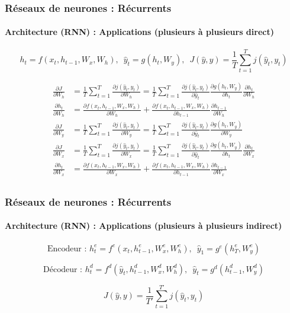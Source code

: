 \documentclass[xcolor=table]{beamer}
\begin{document}
\begin{frame}
	\frametitle{Réseaux de neurones : Récurrents}
	\framesubtitle{Architecture (RNN) : Applications (plusieurs à plusieurs direct)}
	\[ h_t = f(x_t, h_{t-1}, W_x, W_h),\,\,\, \hat{y}_t = g(h_t, W_y),\,\,\,  J(\hat{y}, y) = \frac{1}{T} \sum_{t=1}^{T} j(\hat{y}_t, y_t)\]

	\begin{minipage}{0.6\textwidth}\scriptsize
		\begin{align*}
			\frac{\partial J}{\partial W_h} & = \frac{1}{T} \sum_{t=1}^{T} \frac{\partial j(\hat{y}_t, y_t)}{\partial W_h}
			= \frac{1}{T} \sum_{t=1}^{T} \frac{\partial j(\hat{y}_t, y_t)}{\partial \hat{y}_t} 
			\frac{\partial g(h_t, W_y)}{\partial h_t} 
			\frac{\partial h_t}{\partial W_h} \\
			\frac{\partial h_t}{\partial W_h} & = 
			\frac{\partial f(x_t, h_{t-1}, W_x, W_h)}{\partial W_h} + 
			\frac{\partial f(x_t, h_{t-1}, W_x, W_h)}{\partial h_{t-1}} \frac{\partial h_{t-1}}{\partial W_h} \\
			\frac{\partial J}{\partial W_y} & =
			\frac{1}{T} \sum_{t=1}^{T} \frac{\partial j(\hat{y}_t, y_t)}{\partial W_y}
			= \frac{1}{T} \sum_{t=1}^{T} \frac{\partial j(\hat{y}_t, y_t)}{\partial \hat{y}_t} 
			\frac{\partial g(h_t, W_y)}{\partial W_y} \\
			\frac{\partial J}{\partial W_x} & = 
			\frac{1}{T} \sum_{t=1}^{T} \frac{\partial j(\hat{y}_t, y_t)}{\partial W_x}
			= \frac{1}{T} \sum_{t=1}^{T} \frac{\partial j(\hat{y}_t, y_t)}{\partial \hat{y}_t} 
			\frac{\partial g(h_t, W_y)}{\partial h_t} 
			\frac{\partial h_t}{\partial W_x} \\
			\frac{\partial h_t}{\partial W_x} & = 
			\frac{\partial f(x_t, h_{t-1}, W_x, W_h)}{\partial W_x} + 
			\frac{\partial f(x_t, h_{t-1}, W_x, W_h)}{\partial h_{t-1}} \frac{\partial h_{t-1}}{\partial W_x} \\
		\end{align*}
	\end{minipage}
	\begin{minipage}{0.38\textwidth}
	\end{minipage}
	
\end{frame}

\begin{frame}
	\frametitle{Réseaux de neurones : Récurrents}
	\framesubtitle{Architecture (RNN) : Applications (plusieurs à plusieurs indirect)}
	
	\vskip-12pt

	\[ \text{Encodeur : } h^e_t = f^e(x_t, h^e_{t-1}, W^e_x, W^e_h), \,\,\, \hat{y}_1 = g^e(h^e_{T}, W_y^e)\]
	
	\[ \text{Décodeur : } h^d_{t} = f^d(\hat{y}_{t}, h^d_{t-1}, W^d_x, W^d_h), \,\,\, \hat{y}_{t} = g^d(h^d_{t-1}, W^d_y)\]

	\[ J(\hat{y}, y) = \frac{1}{T'} \sum_{t=1}^{T'} j(\hat{y}_{t}, y_t)\]
	
	\begin{center}
	\end{center}
\end{frame}
\end{document}

